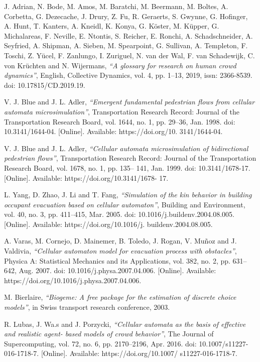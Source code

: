 \documentclass{standalone}
\begin{document}
\begin{thebibliography}{99}
J. Adrian, N. Bode, M. Amos, M. Baratchi, M. Beermann, M. Boltes, A. Corbetta, G. Dezecache, J. Drury, Z. Fu, R. Geraerts, S. Gwynne, G. Hofinger, A. Hunt, T. Kanters, A. Kneidl, K. Konya, G. Köster, M. Küpper, G. Michalareas, F. Neville, E. Ntontis, S. Reicher, E. Ronchi, A. Schadschneider, A. Seyfried, A. Shipman, A. Sieben, M. Spearpoint, G. Sullivan, A. Templeton, F. Toschi, Z. Yücel, F. Zanlungo, I. Zuriguel, N. van der Wal, F. van Schadewijk, C. von Krüchten and N. Wijermans, 
  \textit{“A glossary for research on human crowd dynamics”}, 
  English, Collective Dynamics, 
  vol. 4, pp. 1–13, 2019, 
  issn: 2366-8539. 
  doi: 10.17815/CD.2019.19.


V. J. Blue and J. L. Adler, 
  \textit{“Emergent fundamental pedestrian flows from cellular automata microsimulation”}, 
  Transportation Research Record: Journal of the Transportation Research Board, vol. 1644, no. 1, pp. 29–36, 
  Jan. 1998. 
  doi: 10.3141/1644-04. 
  [Online]. Available: https://doi.org/10. 3141/1644-04.

V. J. Blue and J. L. Adler, 
  \textit{“Cellular automata microsimulation of bidirectional pedestrian flows”}, 
  Transportation Research Record: Journal of the Transportation Research Board, vol. 1678, no. 1, pp. 135– 141, 
  Jan. 1999. 
  doi: 10.3141/1678-17. 
  [Online]. Available: https://doi.org/10.3141/1678- 17.

L. Yang, D. Zhao, J. Li and T. Fang,
  \textit{“Simulation of the kin behavior in building occupant evacuation based on cellular automaton”}, 
Building and Environment, vol. 40, no. 3, pp. 411–415, 
Mar. 2005. 
doi: 10.1016/j.buildenv.2004.08.005. 
[Online]. Available: https://doi.org/10.1016/j. buildenv.2004.08.005.

A. Varas, M. Cornejo, D. Mainemer, B. Toledo, J. Rogan, V. Muñoz and J. Valdivia, 
  \textit{“Cellular automaton model for evacuation process with obstacles”}, 
Physica A: Statistical Mechanics and its Applications, vol. 382, no. 2, pp. 631–642, 
Aug. 2007. 
doi: 10.1016/j.physa.2007.04.006. 
[Online]. Available: https://doi.org/10.1016/j.physa.2007.04.006.

M. Bierlaire,
  \textit{“Biogeme: A free package for the estimation of discrete choice models”}, 
in Swiss transport research conference, 
2003.

R. Lubas, J. Wa.s and J. Porzycki,
  \textit{“Cellular automata as the basis of effective and realistic agent- based models of crowd behavior”}, 
The Journal of Supercomputing, vol. 72, no. 6, pp. 2170–2196, 
Apr. 2016. 
doi: 10.1007/s11227-016-1718-7. 
[Online]. Available: https://doi.org/10.1007/ s11227-016-1718-7.


\end{thebibliography}
\end{document}
